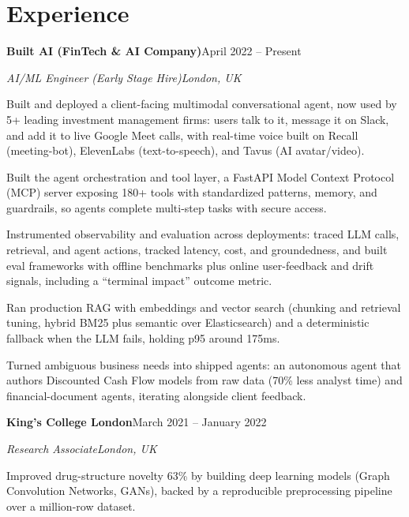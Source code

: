 \documentclass[10pt,a4paper]{article}
\newcommand{\entry}[4]{%
  {\color{company}\bfseries #1}\hfill {\color{muted}#2}\par
  \vspace{1pt}
  {\itshape #3}\hfill {\color{muted}\itshape #4}\par
  \vspace{3pt}%
}
\begin{document}
\section{Experience}
\entry{Built AI (FinTech \& AI Company)}{April 2022 -- Present}{AI/ML Engineer (Early Stage Hire)}{London, UK}
\begin{tight}
  \item Built and deployed a client-facing multimodal conversational agent, now used by 5+ leading investment management firms: users talk to it, message it on Slack, and add it to live Google Meet calls, with real-time voice built on Recall (meeting-bot), ElevenLabs (text-to-speech), and Tavus (AI avatar/video).
  \item Built the agent orchestration and tool layer, a FastAPI Model Context Protocol (MCP) server exposing 180+ tools with standardized patterns, memory, and guardrails, so agents complete multi-step tasks with secure access.
  \item Instrumented observability and evaluation across deployments: traced LLM calls, retrieval, and agent actions, tracked latency, cost, and groundedness, and built eval frameworks with offline benchmarks plus online user-feedback and drift signals, including a ``terminal impact'' outcome metric.
  \item Ran production RAG with embeddings and vector search (chunking and retrieval tuning, hybrid BM25 plus semantic over Elasticsearch) and a deterministic fallback when the LLM fails, holding p95 around 175ms.
  \item Turned ambiguous business needs into shipped agents: an autonomous agent that authors Discounted Cash Flow models from raw data (70\% less analyst time) and financial-document agents, iterating alongside client feedback.
\end{tight}

\entry{King's College London}{March 2021 -- January 2022}{Research Associate}{London, UK}
\begin{tight}
  \item Improved drug-structure novelty 63\% by building deep learning models (Graph Convolution Networks, GANs), backed by a reproducible preprocessing pipeline over a million-row dataset.
\end{tight}

\end{document}
